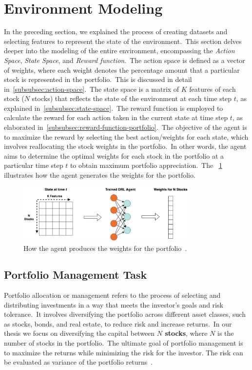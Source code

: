 \documentclass[../xlapes02]{subfiles}
\begin{document}


    \section{Environment Modeling}\label{sec:environment-modeling}
    In the preceding section, we explained the process of creating datasets and selecting features to represent the state of the environment.\ This section delves deeper into the modeling of the entire environment, encompassing the \emph{Action Space}, \emph{State Space}, and \emph{Reward function}.\ The action space is defined as a vector of weights, where each weight denotes the percentage amount that a particular stock is represented in the portfolio.\ This is discussed in detail in~\cref{subsubsec:action-space}.\ The state space is a matrix of $K$ features of each stock ($N$ stocks) that reflects the state of the environment at each time step $t$, as explained in~\cref{subsubsec:state-space}.\ The reward function is employed to calculate the reward for each action taken in the current state at time step $t$, as elaborated in~\cref{subsubsec:reward-function-portfolio}.\ The objective of the agent is to maximize the reward by selecting the best action/weights for each state, which involves reallocating the stock weights in the portfolio.\ In other words, the agent aims to determine the optimal weights for each stock in the portfolio at a particular time step $t$ to obtain maximum portfolio appreciation.\ The ~\cref{fig:state_agent_weights} illustrates how the agent generates the weights for the portfolio.

    \begin{figure}[ht!]
        \centering
        \includegraphics[width=0.8\textwidth]{./image/state_agent_weightss}
        \caption{How the agent produces the weights for the portfolio~\cite{finrl-portfolio-allocation-2020}.}
        \label{fig:state_agent_weights}
    \end{figure}

    \subsection{Portfolio Management Task}\label{subsec:portfolio-management-task}
    Portfolio allocation or management refers to the process of selecting and distributing investments in a way that meets the investor's goals and risk tolerance.\ It involves diversifying the portfolio across different asset classes, such as stocks, bonds, and real estate, to reduce risk and increase returns.\ In our thesis we focus on diversifying the capital between \textbf{$N$ stocks}, where $N$ is the number of stocks in the portfolio.\ The ultimate goal of portfolio management is to maximize the returns while minimizing the risk for the investor. The risk can be evaluated as variance of the portfolio returns~\cite{finrl-portfolio-allocation-2020}.
\end{document}
